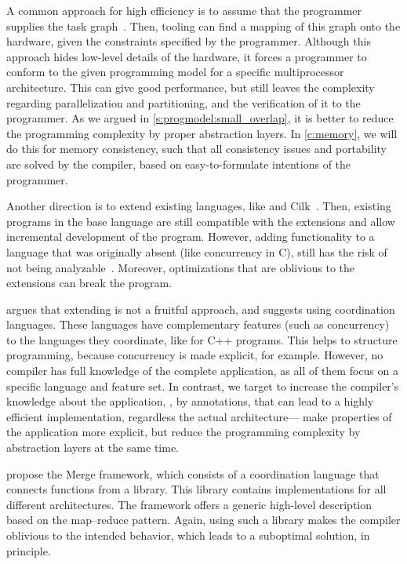 A common approach for high efficiency is to assume that the programmer supplies the task graph~\cite{nikolov:systematic_design,hansson:compsoc,kwon:parallel_framework}.
Then, tooling can find a mapping of this graph onto the hardware, given the constraints specified by the programmer.
Although this approach hides low-level details of the hardware, it forces a programmer to conform to the given programming model for a specific multiprocessor architecture.
This can give good performance, but still leaves the complexity regarding parallelization and partitioning, and the verification of it to the programmer.
As we argued in \cref{s:progmodel:small_overlap}, it is better to reduce the programming complexity by proper abstraction layers.
In \cref{c:memory}, we will do this for memory consistency, such that all consistency issues and portability are solved by the compiler, based on easy-to-formulate intentions of the programmer.

Another direction is to extend existing languages, like  and Cilk~\cite{blumofe:cilk}.
Then, existing programs in the base language are still compatible with the extensions and allow incremental development of the program.
However, adding functionality to a language that was originally absent (like concurrency in C), still has the risk of not being analyzable~\cite{lee:problem_with_threads,boehm:threads_no_lib}.
Moreover, optimizations that are oblivious to the extensions can break the program.

 argues that extending is not a fruitful approach, and suggests using coordination languages.
These languages have complementary features (such as concurrency) to the languages they coordinate, like  for C++ programs.
This helps to structure programming, because concurrency is made explicit, for example.
However, no compiler has full knowledge of the complete application, as all of them focus on a specific language and feature set.
In contrast, we target to increase the compiler's knowledge about the application, \eg, by annotations, that can lead to a highly efficient implementation, regardless the actual architecture--- make properties of the application more explicit, but reduce the programming complexity by abstraction layers at the same time.

 propose the Merge framework, which consists of a coordination language that connects functions from a library.
This library contains implementations for all different architectures.
The framework offers a generic high-level description based on the map--reduce pattern.
Again, using such a library makes the compiler oblivious to the intended behavior, which leads to a suboptimal solution, in principle.

